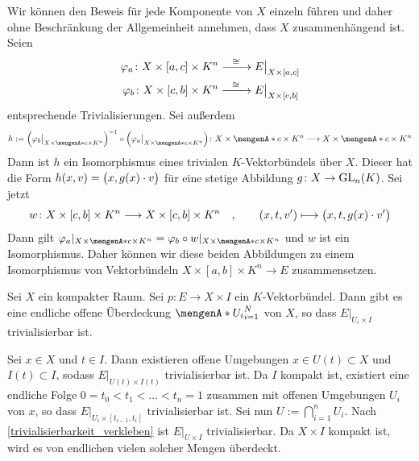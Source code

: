 \begin{beweis}
Wir können den Beweis für jede Komponente von $X$ einzeln führen und daher ohne Beschränkung der Allgemeinheit annehmen, dass $X$ zusammenhängend ist. Seien 
\begin{align*}
	\varphi_a \colon X \times [a,c] \times K^n &\xrightarrow{\minwidthbox{\cong}{2em}} E\big|_{X \times [a,c]} \\ 
	\varphi_b \colon X \times [c,b] \times K^n &\xrightarrow{\minwidthbox{\cong}{2em}} E\big|_{X \times [c,b]}
\end{align*}
entsprechende Trivialisierungen. Sei außerdem
\[
	h := \enbrace*{\varphi_b\big|_{X \times \set{c} \times K^n }} ^{-1} \circ  \enbrace*{\varphi_a\big|_{X \times \set{c} \times K^n}} \colon X \times \set{c} \times K^n 
	\longrightarrow X \times \set{c} \times K^n    
\]
Dann ist $h$ ein Isomorphismus eines trivialen $K$-Vektorbündels über $X$.
Dieser hat die Form $h(x,v)= \enbrace[\big]{x , g(x) \cdot v}$ für eine stetige Abbildung $g \colon X \to \GL_n(K)$. Sei jetzt 
\[
	w \colon X \times [c,b] \times K^n \longrightarrow X \times [c,b] \times K^n \quad , \qquad (x,t,v') \longmapsto \enbrace[\big]{x,t,g(x)\cdot v'}
\]
Dann gilt $\varphi_a|_{X \times \set{c} \times K^n} = \varphi_b \circ w |_{X \times \set{c} \times K^n }$ und $w$ ist ein Isomorphismus. Daher können wir diese beiden 
Abbildungen zu einem Isomorphismus von Vektorbündeln $X \times [a,b] \times K^n \to E$ zusammensetzen.
\end{beweis}

\begin{lemma}[{name=[{Endliche Überdeckung $\set{U_i}_{i=1}^N$, sodass Trivialisierbarkeit auf $U_i$ gilt}]},label=trivialisierbarkeit_ueberdeckung]
Sei $X$ ein kompakter Raum. Sei $p \colon E \to X \times I$ ein $K$-Vektorbündel. Dann gibt es eine endliche offene Überdeckung $\set{U_i}_{i=1}^N$ von $X$, so dass 
$E|_{U_i \times I}$ trivialisierbar ist.	
\end{lemma}

\begin{beweis}
Sei $x \in X$ und $t \in I$. Dann existieren offene Umgebungen $x \in U(t) \subset X$ und $I(t) \subset I$, sodass $E|_{U(t) \times I(t)}$ trivialisierbar ist. Da $I$ 
kompakt ist, existiert eine endliche Folge $0=t_0 < t_1 < \ldots < t_n =1$ zusammen mit offenen Umgebungen $U_i$ von $x$, so dass $E|_{U_i \times [t_{i-1}, t_i]}$ 
trivialisierbar ist. Sei nun $U := \bigcap_{i=1}^n U_i$. Nach \autoref{trivialisierbarkeit_verkleben} ist $E|_{U \times I}$ trivialisierbar. Da $X \times I$ kompakt ist, 
wird es von endlichen vielen solcher Mengen überdeckt. 	
\end{beweis}


